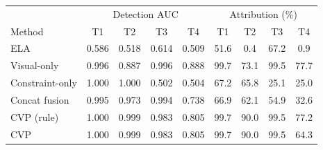 \begin{tabular}{lcccc|cccc}
\toprule
 & \multicolumn{4}{c|}{Detection AUC} & \multicolumn{4}{c}{Attribution (\%)}\\
Method & T1 & T2 & T3 & T4 & T1 & T2 & T3 & T4\\
\midrule
ELA & 0.586 & 0.518 & 0.614 & 0.509 & 51.6 & 0.4 & 67.2 & 0.9\\
Visual-only & 0.996 & 0.887 & 0.996 & 0.888 & 99.7 & 73.1 & 99.5 & 77.7\\
Constraint-only & 1.000 & 1.000 & 0.502 & 0.504 & 67.2 & 65.8 & 25.1 & 25.0\\
Concat fusion & 0.995 & 0.973 & 0.994 & 0.738 & 66.9 & 62.1 & 54.9 & 32.6\\
CVP (rule) & 1.000 & 0.999 & 0.983 & 0.805 & 99.7 & 90.0 & 99.5 & 77.2\\
CVP & 1.000 & 0.999 & 0.983 & 0.805 & 99.7 & 90.0 & 99.5 & 64.3\\
\bottomrule
\end{tabular}
